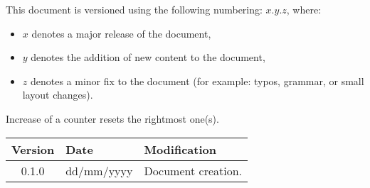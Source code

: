\changelog
This document is versioned using the following numbering: $x.y.z$, where:
\begin{itemize}
	\item $x$ denotes a major release of the document,
	\item $y$ denotes the addition of new content to the document,
	\item $z$ denotes a minor fix to the document (for example: typos, grammar, or small layout changes).
\end{itemize}
Increase of a counter resets the rightmost one(s).
\\[\baselineskip]
\noindent
\begin{tabularx}{\textwidth}{clX}
	\toprule
	\textbf{Version} & \textbf{Date} & \textbf{Modification}\\
	\toprule
	0.1.0 & dd/mm/yyyy & Document creation.\\
	\midrule

	\bottomrule
\end{tabularx}
